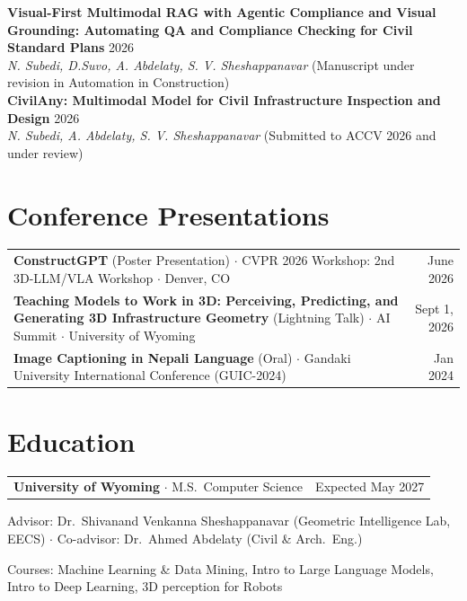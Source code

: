 \documentclass[a4paper,10pt]{article}
\begin{document}
\textbf{Visual-First Multimodal RAG with Agentic Compliance and Visual Grounding: Automating QA and Compliance Checking for Civil Standard Plans } \hfill 2026\\
\textit{N. Subedi, D.Suvo, A. Abdelaty, S. V. Sheshappanavar}
(Manuscript under revision in  Automation in Construction) \\

\textbf{CivilAny: Multimodal Model for Civil Infrastructure Inspection and Design } \hfill 2026\\
\textit{N. Subedi, A. Abdelaty, S. V. Sheshappanavar}
(Submitted to ACCV 2026 and under review)



\section{Conference Presentations}
\begin{tabularx}{\linewidth}{@{}X r@{}}
\textbf{ConstructGPT} (Poster Presentation) $\cdot$ CVPR 2026 Workshop: 2nd 3D-LLM/VLA Workshop $\cdot$ Denver, CO & June 2026 \\[2pt]
\textbf{Teaching Models to Work in 3D: Perceiving, Predicting, and Generating 3D Infrastructure Geometry} (Lightning Talk) $\cdot$ AI Summit $\cdot$ University of Wyoming & Sept 1, 2026 \\[2pt]
\textbf{Image Captioning in Nepali Language} (Oral) $\cdot$ Gandaki University International Conference (GUIC-2024) & Jan 2024 \\
\end{tabularx}

\section{Education}

\begin{tabularx}{\linewidth}{@{}X r@{}}
\textbf{University of Wyoming} $\cdot$ M.S.\ Computer Science & Expected May 2027 \\
\end{tabularx}
\begin{itemize}[itemsep=-5pt, leftmargin=0.8em]
{
    \item  Advisor: Dr.\ Shivanand Venkanna Sheshappanavar (Geometric Intelligence Lab, EECS) $\cdot$ Co-advisor: Dr.\ Ahmed Abdelaty (Civil \& Arch.\ Eng.)
    \item Courses: Machine Learning \& Data Mining, Intro to Large Language Models, Intro to Deep Learning, 3D perception for Robots
}
\end{itemize}
\end{document}
